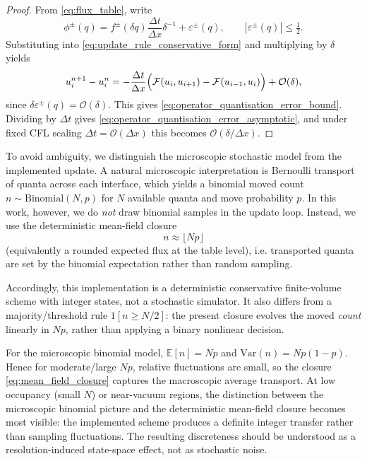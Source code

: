 \documentclass[sn-basic]{sn-jnl}
\theoremstyle{plain}
\theoremstyle{remark}
\begin{document}
\begin{proof}
From \cref{eq:flux_table}, write
\[
\phi^\pm(q)= f^\pm(\delta q)\frac{\Delta t}{\Delta x}\delta^{-1}+\varepsilon^\pm(q),
\qquad |\varepsilon^\pm(q)|\le \tfrac12.
\]
Substituting into \cref{eq:update_rule_conservative_form} and multiplying by $\delta$ yields
\[
u_i^{n+1}-u_i^n
= -\frac{\Delta t}{\Delta x}\Bigl(\mathcal F(u_i,u_{i+1})-\mathcal F(u_{i-1},u_i)\Bigr)
+ \mathcal O(\delta),
\]
since $\delta\varepsilon^\pm(q)=\mathcal O(\delta)$. This gives \cref{eq:operator_quantisation_error_bound}. Dividing by $\Delta t$ gives \cref{eq:operator_quantisation_error_asymptotic}, and under fixed CFL scaling $\Delta t=\mathcal O(\Delta x)$ this becomes $\mathcal O(\delta/\Delta x)$.

\end{proof}



To avoid ambiguity, we distinguish the microscopic stochastic model from the implemented update.
A natural microscopic interpretation is Bernoulli transport of quanta across each interface, which yields a binomial moved count
\(
n\sim \mathrm{Binomial}(N,p)
\)
for \(N\) available quanta and move probability \(p\).
In this work, however, we do \emph{not} draw binomial samples in the update loop.
Instead, we use the deterministic mean-field closure
\begin{equation}
n \approx \lfloor Np \rfloor
\label{eq:mean_field_closure}
\end{equation}
(equivalently a rounded expected flux at the table level), i.e. transported quanta are set by the binomial expectation rather than random sampling.

Accordingly, this implementation is a deterministic conservative finite-volume scheme with integer states, not a stochastic simulator.
It also differs from a majority/threshold rule \(1[n\ge N/2]\): the present closure evolves the moved \emph{count} linearly in \(Np\), rather than applying a binary nonlinear decision.

For the microscopic binomial model, \(\mathbb{E}[n]=Np\) and \(\mathrm{Var}(n)=Np(1-p)\).
Hence for moderate/large \(Np\), relative fluctuations are small, so the closure \cref{eq:mean_field_closure} captures the macroscopic average transport.
At low occupancy (small \(N\)) or near-vacuum regions, the distinction between the microscopic binomial picture and the deterministic mean-field closure becomes most visible: the implemented scheme produces a definite integer transfer rather than sampling fluctuations. The resulting discreteness should be understood as a resolution-induced state-space effect, not as stochastic noise.
\end{document}
